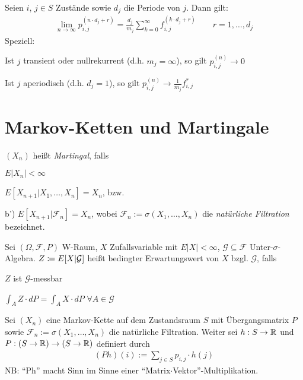 \documentclass[a4paper,twoside,DIV15,BCOR12mm]{scrbook}
\newcommand{\cF}{\mathcal F}
\begin{document}
\begin{satz}
  Seien $i$, $j \in S$ Zustände sowie $d_j$ die Periode von $j$. Dann gilt:
  \begin{align*}
    \lim_{n \rightarrow \infty} p_{i,j}^{(n \cdot d_j + r)} = \frac{d_j}{m_j} \sum_{k=0}^\infty f_{i,j}^{(k \cdot d_j + r)} \qquad r=1,\ldots,d_j
  \end{align*}
  Speziell:
  \begin{enuma}
  \item Ist $j$ transient oder nullrekurrent (d.h. $m_j = \infty$), so gilt $p_{i,j}^{(n)} \longrightarrow 0$
  \item Ist $j$ aperiodisch (d.h. $d_j = 1$), so gilt $p_{i,j}^{(n)} \longrightarrow \frac{1}{m_j} f_{i,j}^*$
  \end{enuma}
\end{satz}


\section{Markov-Ketten und Martingale}

\begin{erinnerung}
  $(X_n)$ heißt \emph{Martingal}, falls
  \begin{enuma}
  \item $E|X_n| < \infty$
  \item $E[X_{n+1}|X_1,\ldots,X_n] = X_n$, bzw.
  \item[b')] $E[X_{n+1}|\cF_n] = X_n$, wobei $\cF_n := \sigma(X_1, \ldots, X_n)$ die \emph{natürliche Filtration} bezeichnet.
  \end{enuma}
\end{erinnerung}

\begin{erinnerung}
  Sei $(\Omega, \cF, P)$ W-Raum, $X$ Zufallsvariable mit $E|X| < \infty$, $\mathcal{G} \subseteq \cF$ Unter-$\sigma$-Algebra.
  $Z \da E[X|\mathcal{G}]$ heißt bedingter Erwartungswert von $X$ bzgl. $\mathcal{G}$, falls
  \begin{enuma}
  \item $Z$ ist $\mathcal{G}$-messbar
  \item $\int_A Z \cdot dP = \int_A X \cdot dP$ \quad $\forall A \in \mathcal{G}$
  \end{enuma}
\end{erinnerung}

Sei $(X_n)$ eine Markov-Kette auf dem Zustandsraum $S$ mit Übergangsmatrix $P$ sowie $\cF_n := \sigma(X_1,\ldots,X_n)$ die natürliche
Filtration. Weiter sei $h: S \rightarrow \mathbb{R}$ und $P: (S \rightarrow \mathbb{R}) \rightarrow (S \rightarrow \mathbb{R})$ definiert durch
\begin{align*}
  (Ph)(i) := \sum_{j \in S} p_{i,j} \cdot h(j)
\end{align*}
NB: ``Ph'' macht Sinn im Sinne einer ``Matrix$\cdot$Vektor''-Multiplikation.
\end{document}
